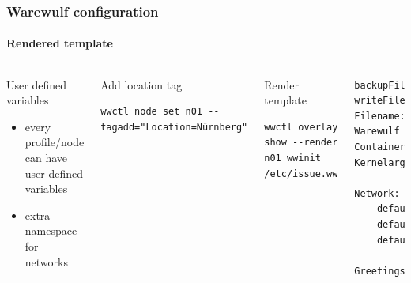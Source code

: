 \documentclass[aspectratio=169]{beamer}
\begin{document}
\begin{frame}[fragile]
\frametitle{Warewulf configuration}
\framesubtitle{Rendered template}
\begin{columns}
\begin{block}{User defined variables}
  \begin{itemize}
    \item every profile/node can have user defined variables\\
    \item extra namespace for networks
  \end{itemize}
\end{block}
\begin{block}{Add location tag}
\begin{lstlisting}[style=wwctl]
wwctl node set n01 --tagadd="Location=Nürnberg"
\end{lstlisting}
\end{block}
\begin{block}{Render template}
\begin{lstlisting}[style=wwctl]
wwctl overlay show --render n01 wwinit /etc/issue.ww
\end{lstlisting}
\end{block}
\begin{lstlisting}[language=xml,style=ww,caption=renderd /etc/issue]
backupFile: true
writeFile: true
Filename: /etc/issue
Warewulf Node:      n01
Container:          leap
Kernelargs:         quiet crashkernel=no vga=791 net.naming-scheme=v238

Network:
    default: eth0
    default: 172.16.130.101/24
    default: 52:54:00:4e:cb:1d

Greetings from Nürnberg
\end{lstlisting}
\end{columns}
\end{frame}
\end{document}

